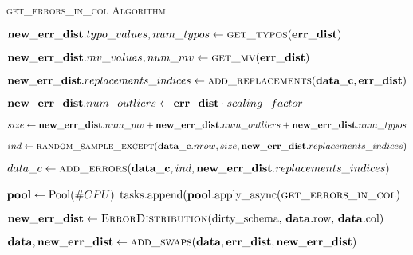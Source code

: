\begin{algorithm}[!t]
    \caption{\textsc{get\_errors\_in\_col Algorithm}}\label{alg:local_get_errors_in_col}
    \begin{algorithmic}[1] 
	  
      \STATE $\mathbf{new\_err\_dist}.typo\_values, num\_typos \leftarrow \textsc{get\_typos}(\mathbf{err\_dist})$ 
	  
      \STATE $\mathbf{new\_err\_dist}.mv\_values, num\_mv \leftarrow \textsc{get\_mv}(\mathbf{err\_dist})$ 
      
      \STATE $\mathbf{new\_err\_dist}.replacements\_indices \leftarrow \textsc{add\_replacements}( \mathbf{data\_c},  \mathbf{err\_dist})$ 
      
      \STATE $\mathbf{new\_err\_dist}.num\_outliers \leftarrow \mathbf{err\_dist} \cdot scaling\_factor$ 
      
      \STATE $size \leftarrow \mathbf{new\_err\_dist}.num\_mv + \mathbf{new\_err\_dist}.num\_outliers + \mathbf{new\_err\_dist}.num\_typos$ 
      
      \STATE $ind \leftarrow \textsc{random\_sample\_except}(\mathbf{data\_c}.nrow, size, \mathbf{new\_err\_dist}.replacements\_indices)$ 
      
	  \STATE $data\_c \leftarrow \textsc{add\_errors}(\mathbf{data\_c}, ind, \mathbf{new\_err\_dist}.replacements\_indices)$ 
	  
	  
	  
	  
	  \STATE $\mathbf{pool} \leftarrow \text{Pool}(\#CPU)$
	   {
        \STATE $\text{tasks.append(\ensuremath{\mathbf{pool}}.apply\_async(\textsc{get\_errors\_in\_col})}$ 
      }\ENDFOR 
      
	  \STATE $\mathbf{new\_err\_dist} \leftarrow \text{\textsc{ErrorDistribution}(dirty\_schema, \ensuremath{\mathbf{data}}.row, \ensuremath{\mathbf{data}}.col)}$
	  
      
      \STATE $\mathbf{data}, \mathbf{new\_err\_dist} \leftarrow \textsc{add\_swaps}(\mathbf{data}, \mathbf{err\_dist}, \mathbf{new\_err\_dist})$ 
      

\end{algorithmic}
\end{algorithm}
